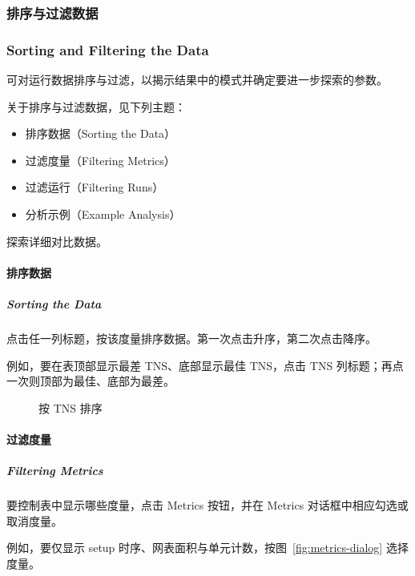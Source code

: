 \subsubsection{排序与过滤数据}
\subsubsection*{Sorting and Filtering the Data}

可对运行数据排序与过滤，以揭示结果中的模式并确定要进一步探索的参数。

关于排序与过滤数据，见下列主题：
\begin{itemize}
  \item 排序数据（Sorting the Data）
  \item 过滤度量（Filtering Metrics）
  \item 过滤运行（Filtering Runs）
  \item 分析示例（Example Analysis）
\end{itemize}

\begin{seeAlsoBox}
探索详细对比数据。
\end{seeAlsoBox}

\paragraph{排序数据}
\subparagraph*{Sorting the Data}

点击任一列标题，按该度量排序数据。第一次点击升序，第二次点击降序。

例如，要在表顶部显示最差 TNS、底部显示最佳 TNS，点击 TNS 列标题；再点一次则顶部为最佳、底部为最差。

\begin{figure}[htbp]
\centering
{}
\caption{按 TNS 排序}
\label{fig:sort-tns}
\end{figure}

\paragraph{过滤度量}
\subparagraph*{Filtering Metrics}

要控制表中显示哪些度量，点击 Metrics 按钮，并在 Metrics 对话框中相应勾选或取消度量。

例如，要仅显示 setup 时序、网表面积与单元计数，按图~\ref{fig:metrics-dialog} 选择度量。

